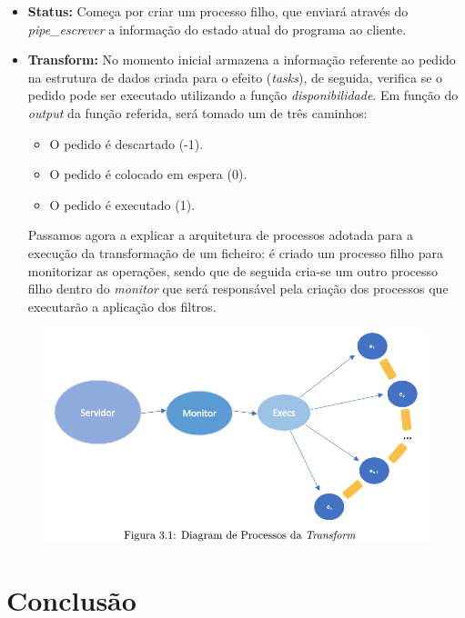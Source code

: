\documentclass[11pt,a4paper]{report}
\begin{document}
\begin{itemize}
     \item{\textbf{Status: } Começa por criar um processo filho, que enviará através do \emph{pipe\_escrever} a informação do estado atual do programa ao cliente.}
     \item{\textbf{Transform: } No momento inicial armazena a informação referente ao pedido na estrutura de dados criada para o efeito (\emph{tasks}), de seguida, verifica se o pedido pode ser executado utilizando a função \emph{disponibilidade}. Em função do \emph{output} da função referida, será tomado um de três caminhos:}
     \begin{itemize}
     \item{O pedido é descartado (-1).}
     \item{ O pedido é colocado em espera (0).}
     \item{O pedido é executado (1).}
     \end{itemize}
     Passamos agora a explicar a arquitetura de processos adotada para a execução da transformação de um ficheiro: é criado um processo filho para monitorizar as operações, sendo que de seguida cria-se um outro processo filho dentro do \emph{monitor} que será responsável pela criação dos processos que executarão a aplicação dos filtros.
\end{itemize}

\newpage

\begin{figure}[h]
    \centering
    \includegraphics[width=1\textwidth]{diagrama}
\end{figure}

\chapter{Conclusão}
\end{document}
